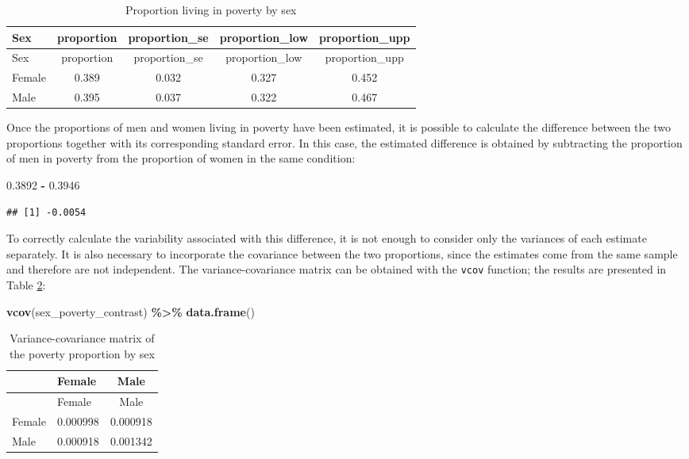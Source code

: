 \documentclass[
  english,
  12pt,
]{book}
\newenvironment{Shaded}{\begin{snugshade}}{\end{snugshade}}
\newcommand{\FloatTok}[1]{\textcolor[rgb]{0.00,0.00,0.81}{#1}}
\newcommand{\FunctionTok}[1]{\textcolor[rgb]{0.13,0.29,0.53}{\textbf{#1}}}
\newcommand{\NormalTok}[1]{#1}
\newcommand{\SpecialCharTok}[1]{\textcolor[rgb]{0.81,0.36,0.00}{\textbf{#1}}}
\begin{document}
\begin{longtable}[]{@{}lcccc@{}}
\caption{\label{tab:tab-svyby-pobreza-sexo2}Proportion living in poverty by sex}\tabularnewline
\toprule\noalign{}
Sex & proportion & proportion\_se & proportion\_low & proportion\_upp \\
\midrule\noalign{}
\endfirsthead
\toprule\noalign{}
Sex & proportion & proportion\_se & proportion\_low & proportion\_upp \\
\midrule\noalign{}
\endhead
\bottomrule\noalign{}
\endlastfoot
Female & 0.389 & 0.032 & 0.327 & 0.452 \\
Male & 0.395 & 0.037 & 0.322 & 0.467 \\
\end{longtable}

Once the proportions of men and women living in poverty have been estimated, it is possible to calculate the difference between the two proportions together with its corresponding standard error. In this case, the estimated difference is obtained by subtracting the proportion of men in poverty from the proportion of women in the same condition:

\begin{Shaded}
\begin{Highlighting}[]
\FloatTok{0.3892} \SpecialCharTok{{-}} \FloatTok{0.3946}
\end{Highlighting}
\end{Shaded}

\begin{verbatim}
## [1] -0.0054
\end{verbatim}

To correctly calculate the variability associated with this difference, it is not enough to consider only the variances of each estimate separately. It is also necessary to incorporate the covariance between the two proportions, since the estimates come from the same sample and therefore are not independent. The variance-covariance matrix can be obtained with the \texttt{vcov} function; the results are presented in Table \ref{tab:tab-vcov-sex-pobreza}:

\begin{Shaded}
\begin{Highlighting}[]
\FunctionTok{vcov}\NormalTok{(sex\_poverty\_contrast) }\SpecialCharTok{\%\textgreater{}\%}
  \FunctionTok{data.frame}\NormalTok{()}
\end{Highlighting}
\end{Shaded}

\begin{longtable}[]{@{}llc@{}}
\caption{\label{tab:tab-vcov-sex-pobreza}Variance-covariance matrix of the poverty proportion by sex}\tabularnewline
\toprule\noalign{}
& Female & Male \\
\midrule\noalign{}
\endfirsthead
\toprule\noalign{}
& Female & Male \\
\midrule\noalign{}
\endhead
\bottomrule\noalign{}
\endlastfoot
Female & 0.000998 & 0.000918 \\
Male & 0.000918 & 0.001342 \\
\end{longtable}
\end{document}
